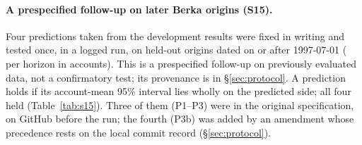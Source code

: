 \paragraph{A prespecified follow-up on later Berka origins (S15).} Four
predictions taken from the development results were fixed in writing and
tested once, in a logged run, on held-out origins dated on or after
1997-07-01 ( per horizon in
 accounts). This is a prespecified follow-up on
previously evaluated data, not a confirmatory test; its provenance is in
\S\ref{sec:protocol}. A prediction holds if its account-mean 95\% interval
lies wholly on the predicted side; all four held (Table~\ref{tab:s15}).
Three of them (P1--P3) were in the original specification, on GitHub
before the run; the fourth (P3b) was added by an amendment whose
precedence rests on the local commit record (\S\ref{sec:protocol}).

